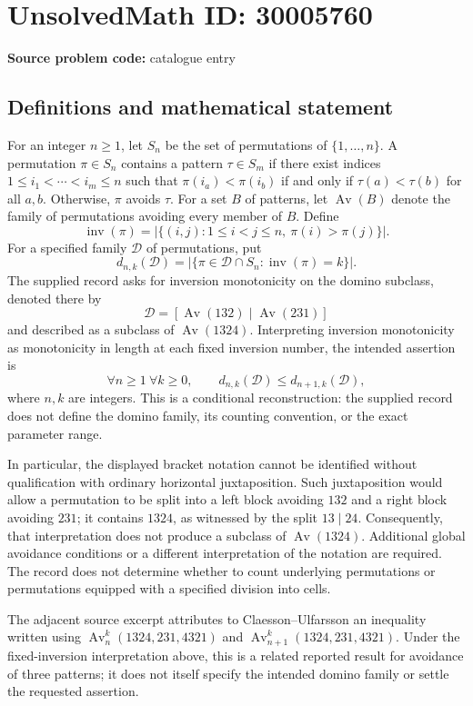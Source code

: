 \documentclass[11pt]{article}
\begin{document}
\section*{UnsolvedMath ID: 30005760}
\textbf{Source problem code:} catalogue entry
\subsection{Definitions and mathematical statement}
For an integer \(n\geq 1\), let \(S_n\) be the set of permutations of \(\{1,\ldots,n\}\). A permutation \(\pi\in S_n\) contains a pattern \(\tau\in S_m\) if there exist indices \(1\leq i_1<\cdots<i_m\leq n\) such that \(\pi(i_a)<\pi(i_b)\) if and only if \(\tau(a)<\tau(b)\) for all \(a,b\). Otherwise, \(\pi\) avoids \(\tau\). For a set \(B\) of patterns, let \(\operatorname{Av}(B)\) denote the family of permutations avoiding every member of \(B\). Define
\[
\operatorname{inv}(\pi)=\bigl|\{(i,j):1\leq i<j\leq n,\ \pi(i)>\pi(j)\}\bigr|.
\]
For a specified family \(\mathcal D\) of permutations, put
\[
d_{n,k}(\mathcal D)=\bigl|\{\pi\in\mathcal D\cap S_n:\operatorname{inv}(\pi)=k\}\bigr|.
\]
The supplied record asks for inversion monotonicity on the domino subclass, denoted there by
\[
\mathcal D=[\operatorname{Av}(132)\mid\operatorname{Av}(231)]
\]
and described as a subclass of \(\operatorname{Av}(1324)\). Interpreting inversion monotonicity as monotonicity in length at each fixed inversion number, the intended assertion is
\[
\forall n\geq 1\ \forall k\geq 0,\qquad d_{n,k}(\mathcal D)\leq d_{n+1,k}(\mathcal D),
\]
where \(n,k\) are integers. This is a conditional reconstruction: the supplied record does not define the domino family, its counting convention, or the exact parameter range.

In particular, the displayed bracket notation cannot be identified without qualification with ordinary horizontal juxtaposition. Such juxtaposition would allow a permutation to be split into a left block avoiding \(132\) and a right block avoiding \(231\); it contains \(1324\), as witnessed by the split \(13\mid24\). Consequently, that interpretation does not produce a subclass of \(\operatorname{Av}(1324)\). Additional global avoidance conditions or a different interpretation of the notation are required. The record does not determine whether to count underlying permutations or permutations equipped with a specified division into cells.

The adjacent source excerpt attributes to Claesson--Ulfarsson an inequality written using \(\operatorname{Av}_n^k(1324,231,4321)\) and \(\operatorname{Av}_{n+1}^k(1324,231,4321)\). Under the fixed-inversion interpretation above, this is a related reported result for avoidance of three patterns; it does not itself specify the intended domino family or settle the requested assertion.
\end{document}
